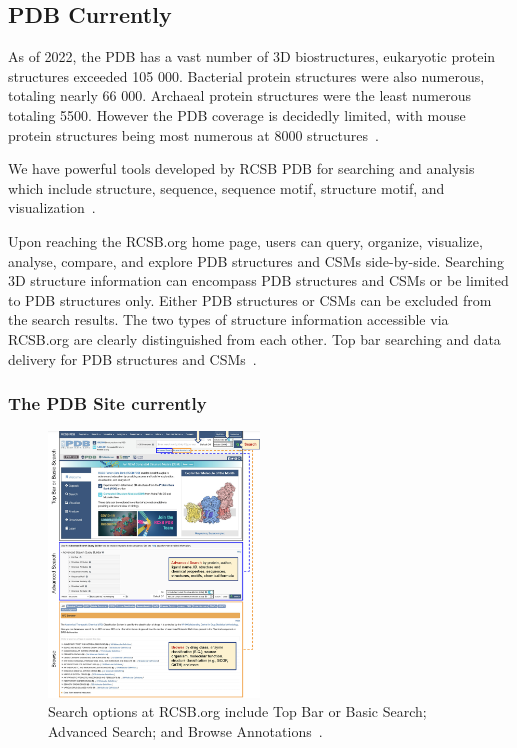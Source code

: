 \documentclass{report}
\begin{document}
\subsection{PDB Currently}

As of 2022, the PDB has a vast number of 3D biostructures, eukaryotic protein structures exceeded 105 000. Bacterial protein structures were also numerous, totaling nearly 66 000. Archaeal protein structures were the least numerous totaling 5500. However the PDB coverage is decidedly limited, with mouse protein structures being most numerous at 8000 structures~\cite{burley_open-access_2021}. 

We have powerful tools developed by RCSB PDB for searching and analysis which include structure, sequence, sequence motif, structure motif, and visualization~\cite{burley1_rcsb_2022}.

Upon reaching the RCSB.org home page, users can query, organize, visualize, analyse, compare, and explore PDB structures and CSMs side-by-side. Searching 3D structure information can encompass PDB structures and CSMs or be limited to PDB structures only. Either PDB structures or CSMs can be excluded from the search results. The two types of structure information accessible via RCSB.org are clearly distinguished from each other. Top bar searching and data delivery for PDB structures and CSMs~\cite{burley1_rcsb_2022}.

\subsubsection{The PDB Site currently}

\begin{figure}[H]
    \centering
    \includegraphics[width=0.5\textwidth]{PDB Site.png}
    \caption{\label{fig:PDB Site.png}Search options at RCSB.org include Top Bar or Basic Search; Advanced Search; and Browse Annotations~\cite{burley1_rcsb_2022}.}
\end{figure}
\end{document}
